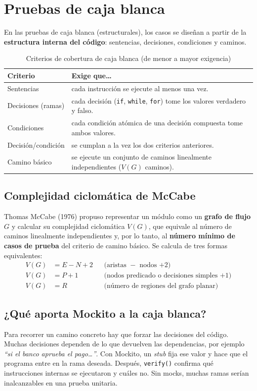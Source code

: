 \documentclass[11pt,a4paper,oneside]{report}
\newcommand{\code}[1]{\texttt{#1}}
\begin{document}
\section{Pruebas de caja blanca}
En las pruebas de caja blanca (estructurales), los casos se diseñan a partir de la \textbf{estructura interna del código}: sentencias, decisiones, condiciones y caminos.

\begin{table}[H]
\centering
\caption{Criterios de cobertura de caja blanca (de menor a mayor exigencia)}
\begin{tabularx}{\linewidth}{lX}
\toprule
\textbf{Criterio} & \textbf{Exige que\ldots}\\
\midrule
Sentencias & cada instrucción se ejecute al menos una vez.\\
Decisiones (ramas) & cada decisión (\code{if}, \code{while}, \code{for}) tome los valores verdadero y falso.\\
Condiciones & cada condición atómica de una decisión compuesta tome ambos valores.\\
Decisión/condición & se cumplan a la vez los dos criterios anteriores.\\
Camino básico & se ejecute un conjunto de caminos linealmente independientes ($V(G)$ caminos).\\
\bottomrule
\end{tabularx}
\end{table}

\subsection{Complejidad ciclomática de McCabe}
Thomas McCabe (1976) propuso representar un módulo como un \textbf{grafo de flujo} $G$ y calcular su complejidad ciclomática $V(G)$, que equivale al número de caminos linealmente independientes y, por lo tanto, al \textbf{número mínimo de casos de prueba} del criterio de camino básico. Se calcula de tres formas equivalentes:
\begin{align*}
  V(G) &= E - N + 2 && \text{(aristas $-$ nodos $+ 2$)}\\
  V(G) &= P + 1     && \text{(nodos predicado o decisiones simples $+ 1$)}\\
  V(G) &= R         && \text{(número de regiones del grafo planar)}
\end{align*}

\subsection{¿Qué aporta Mockito a la caja blanca?}
Para recorrer un camino concreto hay que forzar las decisiones del código. Muchas decisiones dependen de lo que devuelven las dependencias, por ejemplo \emph{``si el banco aprueba el pago\ldots''}. Con Mockito, un \emph{stub} fija ese valor y hace que el programa entre en la rama deseada. Después, \code{verify()} confirma qué instrucciones internas se ejecutaron y cuáles no. Sin mocks, muchas ramas serían inalcanzables en una prueba unitaria.
\end{document}
